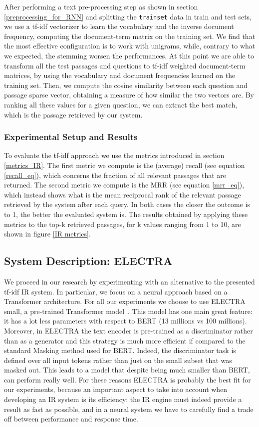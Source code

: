 \documentclass{article}
\newcommand{\code}[1]{\colorbox{light-gray}{\texttt{#1}}}
\begin{document}
After performing a text pre-processing step as shown in section \ref{preprocessing_for_RNN} and splitting the \code{trainset} data in train and test sets, we use a tf-idf vectorizer to learn the vocabulary and the inverse document frequency, computing the document-term matrix on the training set. We find that the most effective configuration is to work with unigrams, while, contrary to what we expected, the stemming worsen the performances.
At this point we are able to transform all the test passages and questions to tf-idf weighted document-term matrices, by using the vocabulary and document frequencies learned on the training set. Then, we compute the cosine similarity between each question and passage sparse vector, obtaining a measure of how similar the two vectors are. By ranking all these values for a given question, we can extract the best match, which is the passage retrieved by our system.

\subsubsection{Experimental Setup and Results}
To evaluate the tf-idf approach we use the metrics introduced in section \ref{metrics_IR}.
The first metric we compute is the (average) recall (see equation \ref{recall_eq}), which concerns the fraction of all relevant passages that are returned. The second metric we compute is the MRR (see equation \ref{mrr_eq}), which instead shows what is the mean reciprocal rank of the relevant passage retrieved by the system after each query. In both cases the closer the outcome is to 1, the better the evaluated system is. 
The results obtained by applying these metrics to the top-k retrieved passages, for k values ranging from 1 to 10, are shown in figure \ref{IR metrics}.


\subsection{System Description: ELECTRA}
We proceed in our research by experimenting with an alternative to the presented tf-idf IR system. In particular, we focus on a neural approach based on a Transformer architecture. For all our experiments we choose to use ELECTRA small, a pre-trained Transformer model~\cite{clark2020electra}. This model has one main great feature: it has a lot less parameters with respect to BERT (13 millions vs 100 millions). Moreover, in ELECTRA the text encoder is pre-trained as a discriminator rather than as a generator and this strategy is much more efficient if compared to the standard Masking method used for BERT. Indeed, the discriminator task is defined over all input tokens rather than just on the small subset that was masked out. This leads to a model that despite being much smaller than BERT, can perform really well. For these reasons ELECTRA is probably the best fit for our experiments, because an important aspect to take into account when developing an IR system is its efficiency: the IR engine must indeed provide a result as fast as possible, and in a neural system we have to carefully find a trade off between performance and response time.
\end{document}
